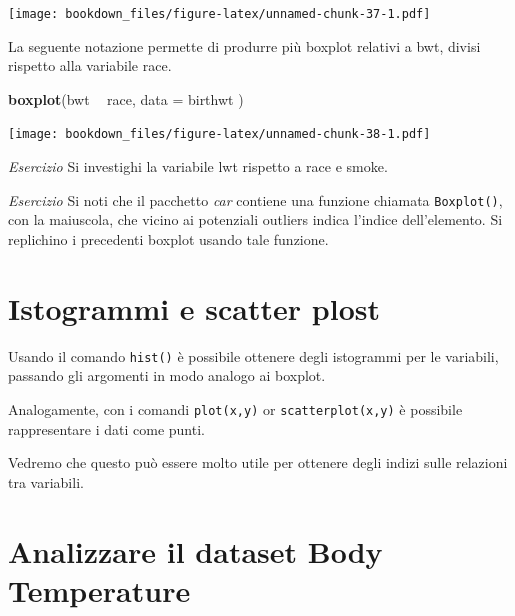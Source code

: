 \documentclass[]{book}
\newenvironment{Shaded}{\begin{snugshade}}{\end{snugshade}}
\newcommand{\DataTypeTok}[1]{\textcolor[rgb]{0.13,0.29,0.53}{#1}}
\newcommand{\KeywordTok}[1]{\textcolor[rgb]{0.13,0.29,0.53}{\textbf{#1}}}
\newcommand{\NormalTok}[1]{#1}
\newcommand{\OperatorTok}[1]{\textcolor[rgb]{0.81,0.36,0.00}{\textbf{#1}}}
\newcommand{\StringTok}[1]{\textcolor[rgb]{0.31,0.60,0.02}{#1}}
\begin{document}
\begin{Shaded}
\end{Shaded}

\texttt{[image: bookdown\_files/figure-latex/unnamed-chunk-37-1.pdf]}

La seguente notazione permette di produrre più boxplot relativi a bwt, divisi rispetto alla variabile race.

\begin{Shaded}
\begin{Highlighting}[]
\KeywordTok{boxplot}\NormalTok{(bwt }\OperatorTok{~}\StringTok{ }\NormalTok{race, }\DataTypeTok{data =}\NormalTok{ birthwt )}
\end{Highlighting}
\end{Shaded}

\texttt{[image: bookdown\_files/figure-latex/unnamed-chunk-38-1.pdf]}

\emph{Esercizio}
Si investighi la variabile lwt rispetto a race e smoke.

\emph{Esercizio}
Si noti che il pacchetto \emph{car} contiene una funzione chiamata \texttt{Boxplot()}, con la maiuscola, che vicino ai potenziali outliers indica l'indice dell'elemento. Si replichino i precedenti boxplot usando tale funzione.

\hypertarget{istogrammi-e-scatter-plost}{%
\section{Istogrammi e scatter plost}\label{istogrammi-e-scatter-plost}}

Usando il comando \texttt{hist()} è possibile ottenere degli istogrammi per le variabili, passando gli argomenti in modo analogo ai boxplot.

Analogamente, con i comandi \texttt{plot(x,y)} or \texttt{scatterplot(x,y)} è possibile rappresentare i dati come punti.

Vedremo che questo può essere molto utile per ottenere degli indizi sulle relazioni tra variabili.

\hypertarget{analizzare-il-dataset-body-temperature}{%
\section{Analizzare il dataset Body Temperature}\label{analizzare-il-dataset-body-temperature}}
\end{document}
